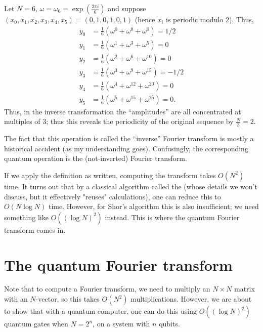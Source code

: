 \begin{example}
	Let $N = 6$, $\omega = \omega_6 = \exp(\frac{2\pi i}{6})$
	and suppose $(x_0,x_1,x_2,x_3,x_4,x_5)=(0,1,0,1,0,1)$
	(hence $x_i$ is periodic modulo $2$).
	Thus,
	\begin{align*}
		y_0 &= \tfrac16\left(\omega^0 + \omega^0+ \omega^0\right) = 1/2 \\
		y_1 &= \tfrac16\left(\omega^1 + \omega^3 + \omega^5\right) = 0 \\
		y_2 &= \tfrac16\left( \omega^2 + \omega^{6} + \omega^{10} \right) = 0 \\
		y_3 &= \tfrac16\left( \omega^3 + \omega^9 + \omega^{15} \right) = -1/2 \\
		y_4 &= \tfrac16\left( \omega^4 + \omega^{12} + \omega^{20} \right) = 0 \\
		y_5 &= \tfrac16\left( \omega^5 + \omega^{15} + \omega^{25} \right) = 0.
	\end{align*}
	Thus, in the inverse transformation the ``amplitudes''
	are all concentrated at multiples of $3$;
	thus this reveals the periodicity of the original
	sequence by $\frac N3 = 2$.
\end{example}
\begin{remark}
	The fact that this operation is called the ``inverse''
	Fourier transform is mostly a historical accident
	(as my understanding goes).
	Confusingly, the corresponding quantum operation is the
	(not-inverted) Fourier transform.
\end{remark}
If we apply the definition as written, computing the transform takes $O(N^2)$ time.
It turns out that by a classical algorithm called the 
(whose details we won't discuss, but it effectively "reuses" calculations), 
one can reduce this to $O(N \log N)$ time.
However, for Shor's algorithm this is also insufficient;
we need something like $O\left( (\log N)^2 \right)$ instead.
This is where the quantum Fourier transform comes in.

\section{The quantum Fourier transform}
Note that to compute a Fourier transform, we need to multiply an $N \times N$ matrix
with an $N$-vector, so this takes $O(N^2)$ multiplications.
However, we are about to show that with a quantum computer,
one can do this using $O( (\log N)^2 )$ quantum gates when $N = 2^n$,
on a system with $n$ qubits.

